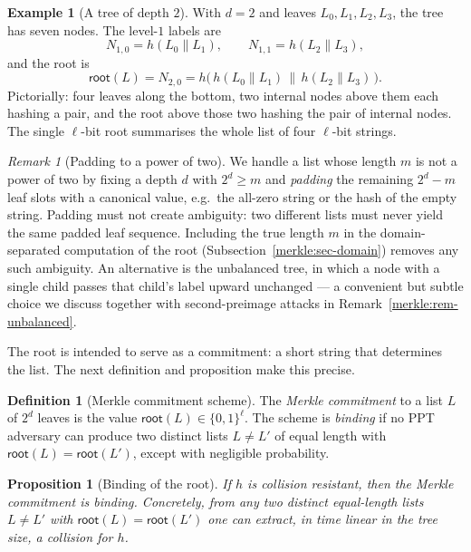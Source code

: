 \documentclass[11pt,a4paper]{article}
\newtheorem{proposition}[theorem]{Proposition}
\theoremstyle{definition}
\newtheorem{definition}[theorem]{Definition}
\newtheorem{example}[theorem]{Example}
\theoremstyle{remark}
\newtheorem{remark}[theorem]{Remark}
\begin{document}
\begin{example}[A tree of depth \(2\)]\label{merkle:exp-depth2}
With \(d = 2\) and leaves \(L_0, L_1, L_2, L_3\), the tree has seven nodes. The level-\(1\) labels are
\[
N_{1,0} = h(L_0 \| L_1), \qquad N_{1,1} = h(L_2 \| L_3),
\]
and the root is
\[
\mathsf{root}(L) = N_{2,0} = h\bigl(\,h(L_0 \| L_1) \,\|\, h(L_2 \| L_3)\,\bigr).
\]
Pictorially: four leaves along the bottom, two internal nodes above them each hashing a pair, and the root above those two hashing the pair of internal nodes. The single \(\ell\)-bit root summarises the whole list of four \(\ell\)-bit strings.
\end{example}

\begin{remark}[Padding to a power of two]\label{merkle:rem-padding}
We handle a list whose length \(m\) is not a power of two by fixing a depth \(d\) with \(2^d \ge m\) and \emph{padding} the remaining \(2^d - m\) leaf slots with a canonical value, e.g.\ the all-zero string or the hash of the empty string. Padding must not create ambiguity: two different lists must never yield the same padded leaf sequence. Including the true length \(m\) in the domain-separated computation of the root (Subsection~\ref{merkle:sec-domain}) removes any such ambiguity. An alternative is the unbalanced tree, in which a node with a single child passes that child's label upward unchanged --- a convenient but subtle choice we discuss together with second-preimage attacks in Remark~\ref{merkle:rem-unbalanced}.
\end{remark}

The root is intended to serve as a commitment: a short string that determines the list. The next definition and proposition make this precise.

\begin{definition}[Merkle commitment scheme]\label{merkle:def-commit}
The \emph{Merkle commitment} to a list \(L\) of \(2^d\) leaves is the value \(\mathsf{root}(L) \in \{0,1\}^\ell\). The scheme is \emph{binding} if no PPT adversary can produce two distinct lists \(L \neq L'\) of equal length with \(\mathsf{root}(L) = \mathsf{root}(L')\), except with negligible probability.
\end{definition}

\begin{proposition}[Binding of the root]\label{merkle:prop-binding}
If \(h\) is collision resistant, then the Merkle commitment is binding. Concretely, from any two distinct equal-length lists \(L \neq L'\) with \(\mathsf{root}(L) = \mathsf{root}(L')\) one can extract, in time linear in the tree size, a collision for \(h\).
\end{proposition}
\end{document}
